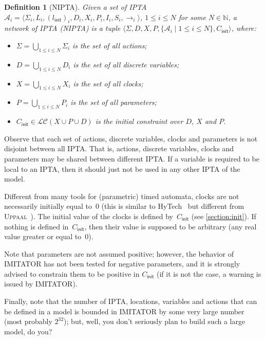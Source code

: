 \documentclass[a4paper,11pt]{report}
\def\init{\ensuremath{\textsf{init}}} %
\newcommand{\A}{\mathcal{A}}
\newcommand{\Action}{\ensuremath{\Sigma}}
\newcommand{\C}{C}
\newcommand{\Cinit}{\C_\init} %
\newcommand{\Clock}{X} %
\newcommand{\DVar}{D} %
\newcommand{\invariant}{I}
\newcommand{\LConstraint}{\mathcal{LC}} %
\newcommand{\LConstraintXPD}{\LConstraint(\Clock \cup \Param \cup \DVar)}
\newcommand{\loc}{l} %
\newcommand{\locinit}{\loc_\init}
\newcommand{\Loc}{L} %
\newcommand{\Param}{P} %
\newcommand{\steps}{ {\rightarrow} }
\newcommand{\stopwatches}{S}
\newcommand{\tuple}[1]{\langle#1\rangle}
\newcommand{\grandn}{{\mathbb N}}
\newcommand{\hytech}{{\sc HyTech}}
\newcommand{\imitator}{\textsf{IMITATOR}}
\newcommand{\IPTA}{IPTA}
\newcommand{\NIPTA}{NIPTA}
\newcommand{\uppaal}{\textsc{Uppaal}}
\newtheorem{definition}{Definition}
\begin{document}
\begin{definition}[\NIPTA{}]
	Given a set of \IPTA{} $\A_i = \tuple{\Action_i, \Loc_i, (\locinit)_i, \DVar_i, \Clock_i, \Param_i, \invariant_i, \stopwatches_i, \steps_i}$, $1 \leq i \leq N$ for some $N \in \grandn$,
	a network of \IPTA{} (\emph{\NIPTA{}}) is a tuple
		$\tuple{\Action, \DVar, \Clock, \Param, \{ \A_i \mid 1 \leq i \leq N \}, \Cinit}$, where:
	\begin{itemize}
		\item $\Action = \bigcup_{1 \leq i \leq N} \Action_i$ is the set of all actions;
		\item $\DVar = \bigcup_{1 \leq i \leq N} \DVar_i$ is the set of all discrete variables;
		\item $\Clock = \bigcup_{1 \leq i \leq N} \Clock_i$ is the set of all clocks;
		\item $\Param = \bigcup_{1 \leq i \leq N} \Param_i$ is the set of all parameters;
		\item $\Cinit \in \LConstraintXPD$ is the initial constraint over $\DVar$, $\Clock$ and $\Param$. %
	\end{itemize}
\end{definition}

Observe that each set of actions, discrete variables, clocks and parameters is not disjoint between all \IPTA{}.
That is, actions, discrete variables, clocks and parameters may be shared between different \IPTA{}.
If a variable is required to be local to an \IPTA{}, then it should just not be used in any other \IPTA{} of the model.

Different from many tools for (parametric) timed automata, clocks are not necessarily initially equal to~0 (this is similar to \hytech{}~\cite{HHW95} but different from \uppaal{}~\cite{LPY97}).
The initial value of the clocks is defined by~$\Cinit$ (see \cref{section:init}).
If nothing is defined in~$\Cinit$, then their value is supposed to be arbitrary (any real value greater or equal to~0).

Note that parameters are not assumed positive; however, the behavior of \imitator{} has not been tested for negative parameters, and it is strongly advised to constrain them to be positive in $\Cinit$ (if it is not the case, a warning is issued by \imitator{}).


Finally, note that the number of \IPTA{}, locations, variables and actions that can be defined in a model is bounded in \imitator{} by some very large number (most probably $2^{32}$); but, well, you don't seriously plan to build such a large model, do you?
\end{document}
